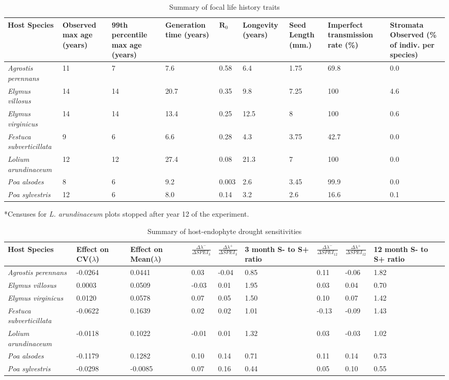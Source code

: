 \documentclass[9pt,twoside,lineno]{pnas-new}
\begin{document}
\begin{table}\centering
		\caption{Summary of focal life history traits }
\begin{tabular}{lp{2cm}p{2cm}p{1.5cm}p{1cm}p{1cm}p{1.5cm}p{1.5cm}p{2cm}}

	Host Species &\raggedright Observed max age (years)& \raggedright 99th percentile max age (years)&Generation time (years) & $\mathbf{R}_0$ &Longevity (years)&Seed Length (mm.)&\raggedright Imperfect transmission rate (\%) & Stromata Observed (\% of indiv. per species)\\
     	\midrule
	\emph{Agrostis perennans} &11&7&7.6&0.58&6.4&1.75&69.8&0.0\\
	\emph{Elymus villosus} &14&14&20.7&0.35&9.8&7.25&100&4.6\\
	\emph{Elymus virginicus} &14&14&13.4&0.25&12.5&8&100&0.6\\
	\emph{Festuca subverticillata} &9&6&6.6&0.28&4.3&3.75&42.7&0.0\\
	\emph{Lolium arundinaceum} &12\footnotemark[1]&12\footnotemark[1]&27.4&0.08&21.3&7&100&0.0\\
	\emph{Poa alsodes} &8&6&9.2&0.003&2.6&3.45&99.9&0.0\\
	\emph{Poa sylvestris}&12&6&8.0&0.14&3.2&2.6&16.6&0.1\\
	\bottomrule

\end{tabular}
\raggedright\footnotesize{*Censuses for \emph{L. arundinaceum} plots stopped after year 12 of the experiment.}
\end{table}

\newpage

\begin{table}\centering
\caption{Summary of host-endophyte drought sensitivities}
\begin{tabular}{lp{1.4cm}p{1.4cm}p{1.5cm}p{1.5cm}p{1.5cm}p{1.5cm}p{1.5cm}p{1.5cm}}
	Host Species& \raggedright Effect on CV($\lambda$)&\raggedright Effect on Mean($\lambda$)&$\frac{\Delta\lambda^{-}}{\Delta SPEI_{3}}$ & $\frac{\Delta\lambda^{+}}{\Delta SPEI_{3}}$ &3 month S- to S+ ratio&$\frac{\Delta\lambda^{-}}{\Delta SPEI_{12}}$ &$\frac{\Delta\lambda^{+}}{\Delta SPEI_{12}}$ & 12 month S- to S+ ratio\\
	\midrule
	\emph{Agrostis perennans} &-0.0264&0.0441&0.03&-0.04&0.85&0.11&-0.06&1.82\\
	\emph{Elymus villosus} &0.0003&0.0509&-0.03&0.01&1.95&0.03&0.04&0.70\\
	\emph{Elymus virginicus} &0.0120&0.0578&0.07&0.05&1.50&0.10&0.07&1.42\\
	\emph{Festuca subverticillata} &-0.0622&0.1639&0.02&0.02&1.01&-0.13&-0.09&1.43\\
	\emph{Lolium arundinaceum} &-0.0118&0.1022&-0.01&0.01&1.32&0.03&-0.03&1.02\\
	\emph{Poa alsodes} &-0.1179&0.1282&0.10&0.14&0.71&0.11&0.14&0.73\\
	\emph{Poa sylvestris}&-0.0298&-0.0085&0.07&0.16&0.44&0.05&0.10&0.55\\
	\bottomrule
\end{tabular}
\end{table}



\FloatBarrier



\end{document}
